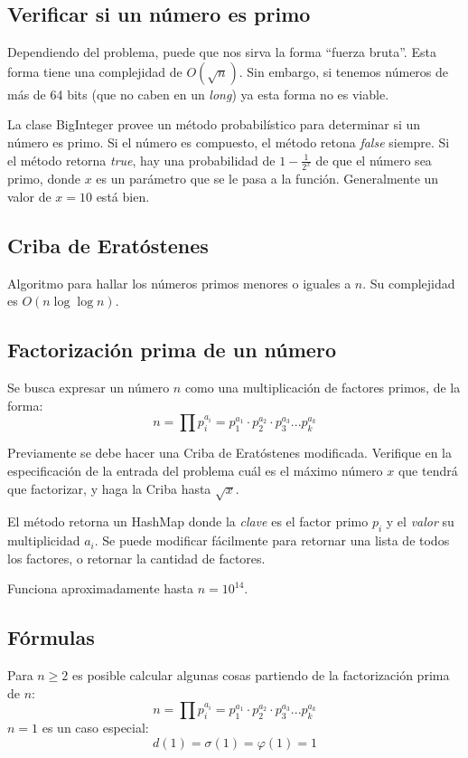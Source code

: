 \documentclass{article}
\begin{document}
\begin{multicols}{2}
	\subsection{Verificar si un número es primo}
	Dependiendo del problema, puede que nos sirva la forma ``fuerza bruta''. Esta forma tiene una complejidad de \( O(\sqrt{n}) \). Sin embargo, si tenemos números de más de 64 bits (que no caben en un \emph{long}) ya esta forma no es viable. 
	
	La clase BigInteger provee un método probabilístico para determinar si un número es primo. Si el número es compuesto, el método retona \emph{false} siempre. Si el método retorna \emph{true}, hay una probabilidad de \( 1-\frac{1}{2^x} \) de que el número sea primo, donde \(x\) es un parámetro que se le pasa a la función. Generalmente un valor de \(x = 10\) está bien.
	

	\subsection{Criba  de Eratóstenes}
	Algoritmo para hallar los números primos menores o iguales a \( n \). Su complejidad es \( O(n \log \log n) \).
	
	
	\subsection{Factorización prima de un número}
	Se busca expresar un número \( n \) como una multiplicación de factores primos, de la forma:
	\[ n = \prod p_{i}^{a_{i}} = p_{1}^{a_{1}} \cdot p_{2}^{a_{2}} \cdot p_{3}^{a_{3}} ...  p_{k}^{a_{k}} \]
	
	Previamente se debe hacer una Criba de Eratóstenes modificada. Verifique en la especificación de la entrada del problema cuál es el máximo número \( x \) que tendrá que factorizar, y haga la Criba hasta \( \sqrt{x} \).
	
	El método retorna un HashMap donde la \emph{clave} es el factor primo \( p_{i} \) y el \emph{valor} su multiplicidad \( a_{i} \). Se puede modificar fácilmente para retornar una lista de todos los factores, o retornar la cantidad de factores.
	
	Funciona aproximadamente hasta \( n = 10^{14} \).
	
	
	\subsection{Fórmulas}
	Para \( n \geq 2 \) es posible calcular algunas cosas partiendo de la factorización prima de \( n \):
	\[ n = \prod p_{i}^{a_{i}} = p_{1}^{a_{1}} \cdot p_{2}^{a_{2}} \cdot p_{3}^{a_{3}} ...  p_{k}^{a_{k}} \]
	\( n = 1 \) es un caso especial:
	\[ d(1) = \sigma (1) = \varphi (1) = 1 \]


\end{multicols}
\end{document}
